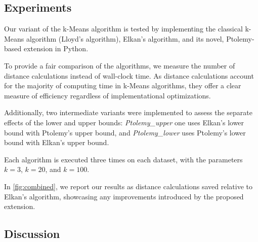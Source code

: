 \subsection{Experiments}
Our variant of the k-Means algorithm is tested by implementing the classical k-Means algorithm (Lloyd's algorithm), Elkan's algorithm, and its novel, Ptolemy-based extension in Python.

To provide a fair comparison of the algorithms,
we measure the number of distance calculations instead of wall-clock time.
As distance calculations account for the majority of computing time in k-Means algorithms, they offer a clear measure of efficiency regardless of implementational optimizations.

Additionally, two intermediate variants were implemented to assess the separate effects of the lower and upper bounds:
\emph{Ptolemy\_upper} one uses Elkan's lower bound with Ptolemy's upper bound, and \emph{Ptolemy\_lower} uses Ptolemy's lower bound with Elkan's upper bound.

Each algorithm is executed three times on each dataset, with the parameters $k = 3$, $k = 20$, and $k = 100$.

In \autoref{fig:combined}, we report our results as distance calculations saved relative to Elkan's algorithm, showcasing any improvements introduced by the proposed extension.



\subsection{Discussion}

